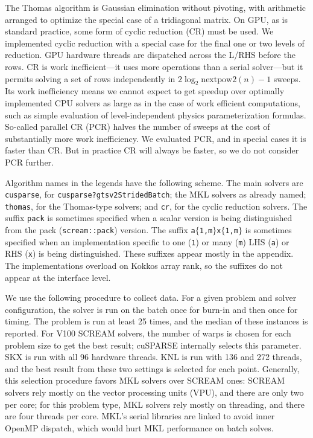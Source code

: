 \documentclass[10pt,twocolumn]{article}
\begin{document}
The Thomas algorithm is Gaussian elimination without pivoting,
with arithmetic arranged to optimize the special case of a tridiagonal matrix.
On GPU, as is standard practice, some form of cyclic reduction (CR) must be used.
We implemented cyclic reduction with a special case for the final one or two levels of reduction.
GPU hardware threads are dispatched across the L/RHS before the rows.
CR is work inefficient---it uses more operations than a serial solver---but
it permits solving a set of rows independently in $2 \log_2 \mathrm{nextpow2}(n) - 1$ sweeps.
Its work inefficiency means we cannot expect to get speedup over optimally implemented CPU solvers as large as
in the case of work efficient computations, such as simple evaluation of level-independent physics parameterization formulas.
So-called parallel CR (PCR) halves the number of sweeps at the cost of substantially more work inefficiency.
We evaluated PCR, and in special cases it is faster than CR.
But in practice CR will always be faster, so we do not consider PCR further.

Algorithm names in the legends have the following scheme.
The main solvers are {\tt cusparse}, for {\tt cusparse?gtsv2StridedBatch};
the MKL solvers as already named;
{\tt thomas}, for the Thomas-type solvers;
and {\tt cr}, for the cyclic reduction solvers.
The suffix {\tt pack} is sometimes specified when a scalar version is being distinguished from the pack ({\tt scream::pack}) version.
The suffix {\tt a$\{$1,m$\}$x$\{$1,m$\}$} is sometimes specified when an implementation specific to one ({\tt 1}) or many ({\tt m}) LHS ({\tt a}) or RHS ({\tt x}) is being distinguished.
These suffixes appear mostly in the appendix.
The implementations overload on Kokkos array rank, so the suffixes do not appear at the interface level.

We use the following procedure to collect data.
For a given problem and solver configuration,
the solver is run on the batch once for burn-in and then once for timing.
The problem is run at least 25 times, and the median of these instances is reported.
For V100 SCREAM solvers,
the number of warps is chosen for each problem size to get the best result;
cuSPARSE internally selects this parameter.
SKX is run with all 96 hardware threads.
KNL is run with 136 and 272 threads,
and the best result from these two settings is selected for each point.
Generally, this selection procedure favors MKL solvers over SCREAM ones:
SCREAM solvers rely mostly on the vector processing units (VPU), and there are only two per core;
for this problem type, MKL solvers rely mostly on threading, and there are four threads per core.
MKL's serial libraries are linked to avoid inner OpenMP dispatch,
which would hurt MKL performance on batch solves.
\end{document}
